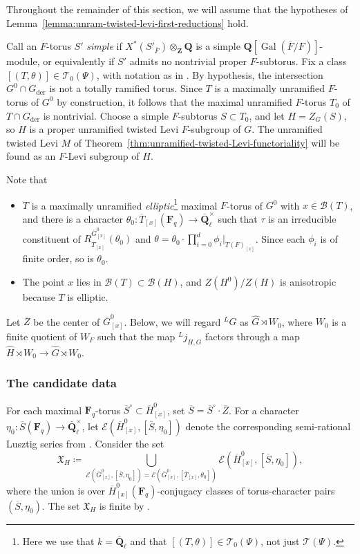 \documentclass[reqno]{amsart}
\numberwithin{equation}{subsection}
\newcommand{\F}{\mathbf{F}}
\newcommand{\Q}{\mathbf{Q}}
\newcommand{\Z}{\mathbf{Z}}
\newcommand{\Gal}{\operatorname{Gal}}
\newcommand{\ol}[1]{\overline{#1}}
\newcommand{\wh}[1]{\widehat{#1}}
\newcommand{\co}{\colon}
\newcommand{\ld}{{}^L}
\newcommand\cB{\mathcal{B}}
\newcommand\cE{\mathcal{E}}
\newcommand\cT{\mathcal{T}}
\DeclareMathOperator{\der}{der}
\theoremstyle{remark}
\numberwithin{equation}{subsection}
\numberwithin{figure}{subsection}
\begin{document}
Throughout the remainder of this section, we will assume that the hypotheses of Lemma~\ref{lemma:unram-twisted-levi-first-reductions} hold.

Call an $F$-torus $S'$ \emph{simple} if $X^*(S'_{\ol F}) \otimes_\Z \Q$ is a simple $\Q[\Gal(\ol F/F)]$-module, or equivalently if $S'$ admits no nontrivial proper $F$-subtorus. Fix a class $[(T, \theta)] \in \cT_0(\Psi)$, with notation as in \cite[Definition~7.2.1]{CF26a}. By hypothesis, the intersection $G^0 \cap G_{\der}$ is not a totally ramified torus. Since $T$ is a maximally unramified $F$-torus of $G^0$ by construction, it follows that the maximal unramified $F$-torus $T_0$ of $T \cap G_{\der}$ is nontrivial. Choose a simple $F$-subtorus $S \subset T_0$, and let $H = Z_G(S)$, so $H$ is a proper unramified twisted Levi $F$-subgroup of $G$. The unramified twisted Levi $M$ of Theorem~\ref{thm:unramified-twisted-Levi-functoriality} will be found as an $F$-Levi subgroup of $H$.

Note that
\begin{itemize}
\item $T$ is a maximally unramified \emph{elliptic}\footnote{Here we use that $k = \ol\Q_\ell$ and that $[(T, \theta)] \in \cT_0(\Psi)$, not just $\cT(\Psi)$.} maximal $F$-torus of $G^0$ with $x \in \cB(T)$, and there is a character $\theta_0 \co \ol T_{[x]}(\F_q) \to \ol\Q_\ell^\times$ such that $\tau$ is an irreducible constituent of $R_{\ol T_{[x]}}^{\ol G^0_{[x]}}(\theta_0)$ and $\theta = \theta_0 \cdot \prod_{i=0}^d \phi_i|_{T(F)_{[x]}}$. Since each $\phi_i$ is of finite order, so is $\theta_0$.
\item The point $x$ lies in $\cB(T) \subset \cB(H)$, and $Z(H^0)/Z(H)$ is anisotropic because $T$ is elliptic.
\end{itemize}
Let $\ol Z$ be the center of $\ol G_{[x]}^0$. Below, we will regard $\ld G$ as $\wh G \rtimes W_0$, where $W_0$ is a finite quotient of $W_F$ such that the map $\ld j_{H,G}$ factors through a map $\wh H \rtimes W_0 \to \wh G \rtimes W_0$.

\subsubsection{The candidate data}\label{sss:candidate-data}

For each maximal $\F_q$-torus $\ol S^\circ \subset \ol H^0_{[x]}$, set $\ol S = \ol S^\circ \cdot \ol Z$. For a character $\eta_0 \co \ol S(\F_q) \to \ol\Q_\ell^\times$, let $\cE(\ol H^0_{[x]}, [\ol S, \eta_0])$ denote the corresponding semi-rational Lusztig series from \cite[Definition~2.8.2]{Cot26b}. Consider the set
\begin{equation}\label{eqn:sigma-G-H-indexing-set}
\mathfrak X_H \coloneqq \bigcup_{\cE(\ol G^0_{[x]}, [\ol S,\eta_0]) = \cE(\ol G^0_{[x]}, [\ol T_{[x]},\theta_0])} \cE(\ol H^0_{[x]}, [\ol S,\eta_0]),
\end{equation}
where the union is over $\ol H^0_{[x]}(\F_q)$-conjugacy classes of torus-character pairs $(\ol S, \eta_0)$. The set $\mathfrak X_H$ is finite by \cite[Lemma~2.8.3]{Cot26b}.
\end{document}

